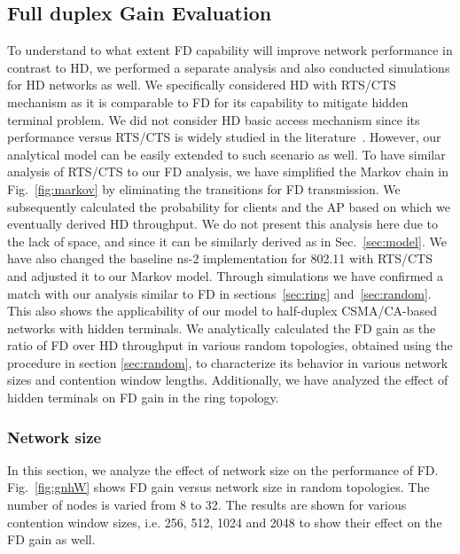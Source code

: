 \documentclass[10pt,journal,cspaper,compsoc]{IEEEtran}
\begin{document}
\subsection{Full duplex Gain Evaluation}
To understand to what extent FD capability will improve network performance in contrast to HD, we performed a separate analysis and also conducted simulations for HD networks as well. We specifically considered HD with RTS/CTS mechanism as it is comparable to FD for its capability to mitigate hidden terminal problem. We did not consider HD basic access mechanism since its performance versus RTS/CTS is widely studied in the literature~\cite{bianchi,Dai13}. However, our analytical model can be easily extended to such scenario as well. To have similar analysis of RTS/CTS to our FD analysis, we have simplified the Markov chain in Fig.~\ref{fig:markov} by eliminating the transitions for FD transmission. We subsequently calculated the probability  for clients and the AP based on which we eventually derived HD throughput. We do not present this analysis here due to the lack of space, and since it can be similarly derived as in Sec.~\ref{sec:model}. We have also changed the baseline ns-2 implementation for 802.11 with RTS/CTS and adjusted it to our Markov model. Through simulations we have confirmed a match with our analysis similar to FD in sections~\ref{sec:ring} and~\ref{sec:random}. This also shows the applicability of our model to half-duplex CSMA/CA-based networks with hidden terminals. We analytically calculated the FD gain as the ratio of FD over HD throughput in various random topologies, obtained using the procedure in section \ref{sec:random}, to characterize its behavior in various network sizes and contention window lengths. Additionally, we have analyzed the effect of hidden terminals on FD gain in the ring topology. 

\subsubsection{Network size}
In this section, we analyze the effect of network size on the performance of FD. Fig.~\ref{fig:gnhW} shows FD gain versus network size in random topologies. The number of nodes is varied from 8 to 32. The results are shown for various contention window sizes, i.e. 256, 512, 1024 and 2048 to show their effect on the FD gain as well. 
\end{document}
